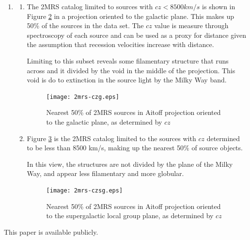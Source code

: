 \documentclass{paper}
\begin{document}
\begin{enumerate}
\begin{enumerate}
      \item
        A similar analysis of a subset of data from the 2MRS data set, 
        though a subset that represents a greater fraction of the overall 
        data set than was selected for the 2MASX analysis, shows the same
        value for slope (0.55 for a model that predicts 0.6). This subset
        represented 88\% of the data set and spans 11.5 mag to 7.0 mag in the
        K band. See Figure \ref{fig:2mrs-bins}

        \begin{figure}[!htb]
          \texttt{[image: 2mrs.eps]}
          \caption{2MRS samples binned by mag K band, count in log}
          \label{fig:2mrs-bins}
        \end{figure}

    \end{enumerate}
  \pagebreak \item %
    \begin{enumerate}
      \item
        The 2MRS catalog limited to sources with \(cz < 8500 km/s\) is shown in
        Figure \ref{fig:2mrs-czg} in a projection oriented to the galactic
        plane. This makes up 50\% of the sources in the data set. The 
        \(cz\) value is measure through spectroscopy of each source and can be
        used as a proxy for distance given the assumption that recession
        velocities increase with distance.

        Limiting to this subset reveals some filamentary structure that runs 
        across and it divided by the void in the middle of the projection. 
        This void is do to extinction in the source light by the Milky Way 
        band.

        \begin{figure}[!htb]
          \texttt{[image: 2mrs-czg.eps]}
          \caption{Nearest 50\% of 2MRS sources in Aitoff projection 
            oriented to the galactic plane, as determined by \(cz\)}
          \label{fig:2mrs-czg}
        \end{figure}
    
      \item
        Figure \ref{fig:2mrs-czsg} is the 2MRS catalog limited to the sources 
        with \(cz\) determined to be less than 8500 km/s, making up the nearest
        50\% of source objects. 

        In this view, the structures are not divided by the plane of the
        Milky Way, and appear less filamentary and more globular.
        \begin{figure}[!htb]
          \texttt{[image: 2mrs-czsg.eps]}
          \caption{Nearest 50\% of 2MRS sources in Aitoff projection 
            oriented to the supergalactic local group plane, as determined 
            by \(cz\)}
          \label{fig:2mrs-czsg}
        \end{figure}
    \end{enumerate}
\end{enumerate}

This paper is available publicly.\cite{Hayden_Cosmology_Source_Repo}

\pagebreak
\printbibliography
\end{document}
